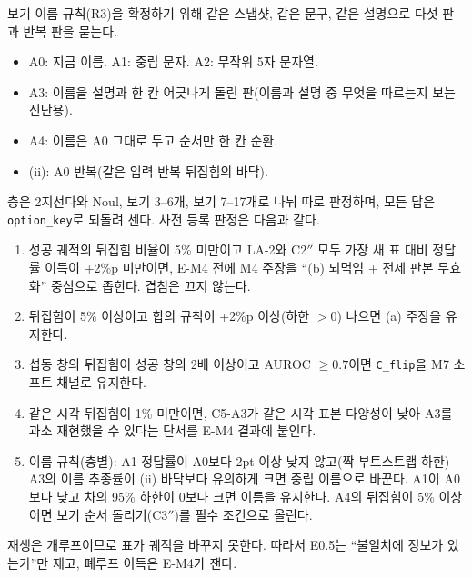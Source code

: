보기 이름 규칙(R3)을 확정하기 위해 같은 스냅샷, 같은 문구, 같은 설명으로 다섯 판과 반복 판을 묻는다.
\begin{itemize}
  \item A0: 지금 이름. A1: 중립 문자. A2: 무작위 5자 문자열.
  \item A3: 이름을 설명과 한 칸 어긋나게 돌린 판(이름과 설명 중 무엇을 따르는지 보는 진단용).
  \item A4: 이름은 A0 그대로 두고 순서만 한 칸 순환.
  \item (ii): A0 반복(같은 입력 반복 뒤집힘의 바닥).
\end{itemize}
층은 2지선다와 Noul, 보기 3--6개, 보기 7--17개로 나눠 따로 판정하며, 모든 답은 \texttt{option\_key}로 되돌려 센다. 사전 등록 판정은 다음과 같다.
\begin{enumerate}
  \item 성공 궤적의 뒤집힘 비율이 5\% 미만이고 LA-2와 C2$''$ 모두 가장 새 표 대비 정답률 이득이 +2\%p 미만이면, E-M4 전에 M4 주장을 ``(b) 되먹임 + 전제 판본 무효화'' 중심으로 좁힌다. 겹침은 끄지 않는다.
  \item 뒤집힘이 5\% 이상이고 합의 규칙이 +2\%p 이상(하한 $>0$) 나으면 (a) 주장을 유지한다.
  \item 섭동 창의 뒤집힘이 성공 창의 2배 이상이고 AUROC $\ge0.7$이면 \texttt{C\_flip}을 M7 소프트 채널로 유지한다.
  \item 같은 시각 뒤집힘이 1\% 미만이면, C5-A3가 같은 시각 표본 다양성이 낮아 A3를 과소 재현했을 수 있다는 단서를 E-M4 결과에 붙인다.
  \item 이름 규칙(층별): A1 정답률이 A0보다 2pt 이상 낮지 않고(짝 부트스트랩 하한) A3의 이름 추종률이 (ii) 바닥보다 유의하게 크면 중립 이름으로 바꾼다. A1이 A0보다 낮고 차의 95\% 하한이 0보다 크면 이름을 유지한다. A4의 뒤집힘이 5\% 이상이면 보기 순서 돌리기(C3$''$)를 필수 조건으로 올린다.
\end{enumerate}
재생은 개루프이므로 표가 궤적을 바꾸지 못한다. 따라서 E0.5는 ``불일치에 정보가 있는가''만 재고, 폐루프 이득은 E-M4가 잰다.

